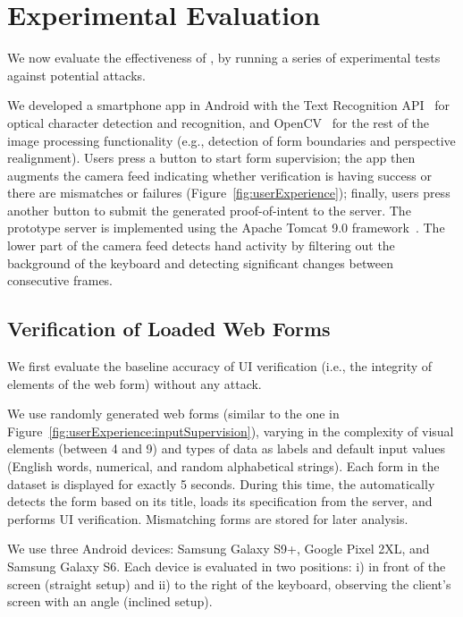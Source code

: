 \section{Experimental Evaluation} 
\label{sec:experimentalEvaluation}

We now evaluate the effectiveness of \sysname, by running a series of experimental tests against potential attacks.

We developed a smartphone app in Android with the Text Recognition API~\cite{googleOCR} for optical character detection and recognition, and OpenCV~\cite{openCV} for the rest of the image processing functionality (e.g., detection of form boundaries and perspective realignment).
Users press a button to start form supervision; the app then augments the camera feed indicating whether verification is having success or there are mismatches or failures (Figure~\ref{fig:userExperience}); finally, users press another button to submit the generated proof-of-intent to the server.  The prototype server is implemented using the Apache Tomcat 9.0 framework~\cite{ApacheTomcat}. The lower part of the camera feed detects hand activity by filtering out the background of the keyboard and detecting significant changes between consecutive frames.

\subsection{Verification of Loaded Web Forms} \label{ssec:UIVerificationEvaluation}

We first evaluate the baseline accuracy of UI verification (i.e., the integrity of elements of the web form) without any attack.


We use \numforms randomly generated web forms (similar to the one in Figure~\ref{fig:userExperience:inputSupervision}), varying in the complexity of visual elements (between 4 and 9) and types of data as labels and default input values (English words, numerical, and random alphabetical strings).
Each form in the dataset is displayed for exactly 5 seconds.
During this time, the \app automatically detects the form based on its title, loads its specification from the server, and performs UI verification.
Mismatching forms are stored for later analysis.

We use three Android devices: Samsung Galaxy S9+, Google Pixel 2XL, and Samsung Galaxy S6. Each device is evaluated in two positions: i) in front of the screen (straight setup) and ii) to the right of the keyboard, observing the client's screen with an angle (inclined setup).

